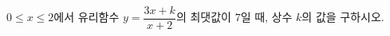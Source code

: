 \hspace*{2mm}\begin{minipage}[t]{\dimexpr\linewidth-2mm\relax}\vspace{0pt}
$0\le x\le 2$에서 유리함수 $y=\dfrac{3x+k}{x+2}$의 최댓값이 $7$일 때, 상수 $k$의 값을 구하시오.\end{minipage}
